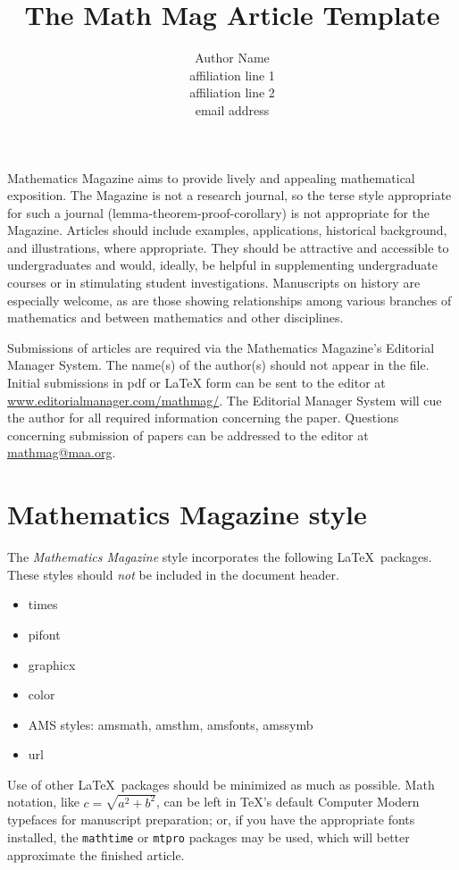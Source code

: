 \documentclass{article}
\theoremstyle{definition}
\begin{document}
\title{The Math Mag Article Template}

\author{Author Name\\               %
\scriptsize affiliation line 1\\    %
affiliation line 2\\                %
email address}                      %

\maketitle

\noindent  Mathematics Magazine aims to provide lively and appealing mathematical exposition. The Magazine is not a research journal, so the terse style appropriate for such a journal (lemma-theorem-proof-corollary) is not appropriate for the Magazine. Articles should include examples, applications, historical background, and illustrations, where appropriate. They should be attractive and accessible to undergraduates and would, ideally, be helpful in supplementing undergraduate courses or in stimulating student investigations. Manuscripts on history are especially welcome, as are those showing relationships among various branches of mathematics and between mathematics and other disciplines.

Submissions of articles are required via the Mathematics Magazine's Editorial Manager System. The name(s) of the author(s) should not appear in the file. Initial submissions in pdf or LaTeX form can be sent to the editor at \href{http://www.editorialmanager.com/mathmag/}{\url{www.editorialmanager.com/mathmag/}}. 
The Editorial Manager System will cue the author for all required information concerning the paper. Questions concerning submission of papers can be addressed to the editor at \href{mathmag@maa.org}{\url{mathmag@maa.org}}.

\section{Mathematics Magazine style}

The \textit{Mathematics Magazine} style incorporates the following \LaTeX\ packages.  These styles should \textit{not} be included in the document header.
\begin{itemize}
\item times
\item pifont
\item graphicx
\item color
\item AMS styles: amsmath, amsthm, amsfonts, amssymb
\item url
\end{itemize}
Use of other \LaTeX\ packages should be minimized as much as possible. Math notation, like $c = \sqrt{a^2 +b^2}$, can be left in \TeX's default Computer Modern typefaces for manuscript preparation; or, if you have the appropriate fonts installed, the \texttt{mathtime} or \texttt{mtpro} packages may be used, which will better approximate the finished article.
\end{document}
